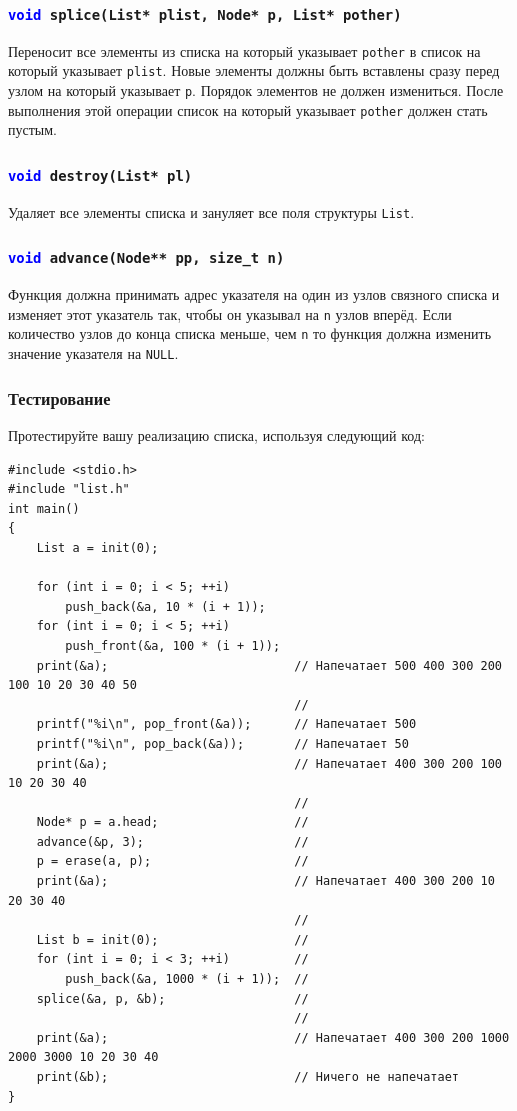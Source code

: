 \documentclass[10pt]{article}
\begin{document}
\subsubsection{\texttt{\textcolor{blue}{void} splice(List* plist, Node* p, List* pother)}}
Переносит все элементы из списка на который указывает \texttt{pother} в список на который указывает \texttt{plist}. Новые элементы должны быть вставлены сразу перед узлом на который указывает \texttt{p}. Порядок элементов не должен измениться. После выполнения этой операции список на который указывает \texttt{pother} должен стать пустым.

\subsubsection{\texttt{\textcolor{blue}{void} destroy(List* pl)}}
Удаляет все элементы списка и зануляет все поля структуры \texttt{List}.


\subsubsection{\texttt{\textcolor{blue}{void} advance(Node** pp, size\_t n)}}
Функция должна принимать адрес указателя на один из узлов связного списка и изменяет этот указатель так, чтобы он указывал на \texttt{n} узлов вперёд. Если количество узлов до конца списка меньше, чем \texttt{n} то функция должна изменить значение указателя на \texttt{NULL}. 


\subsubsection{Тестирование}
Протестируйте вашу реализацию списка, используя следующий код:
\begin{lstlisting}
#include <stdio.h>
#include "list.h"
int main()
{
    List a = init(0);
    
    for (int i = 0; i < 5; ++i)
        push_back(&a, 10 * (i + 1));
    for (int i = 0; i < 5; ++i)
        push_front(&a, 100 * (i + 1));
    print(&a);                          // Напечатает 500 400 300 200 100 10 20 30 40 50
                                        //                
    printf("%i\n", pop_front(&a));      // Напечатает 500
    printf("%i\n", pop_back(&a));       // Напечатает 50
    print(&a);                          // Напечатает 400 300 200 100 10 20 30 40
                                        //            
    Node* p = a.head;                   //     
    advance(&p, 3);                     //
    p = erase(a, p);                    //
    print(&a);                          // Напечатает 400 300 200 10 20 30 40
                                        //            
    List b = init(0);                   //
    for (int i = 0; i < 3; ++i)         //
        push_back(&a, 1000 * (i + 1));  //
    splice(&a, p, &b);                  //
                                        //
    print(&a);                          // Напечатает 400 300 200 1000 2000 3000 10 20 30 40
    print(&b);                          // Ничего не напечатает
}

\end{lstlisting}
\end{document}
